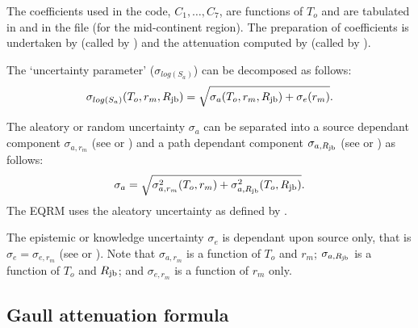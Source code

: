 The coefficients used in the code, $C_1,\ldots,C_7$, are functions
of $T_o$ and are tabulated in \citet[Table 2]{dr_Toro97a} and in
the file 
(for the mid-continent region). The preparation of coefficients is
undertaken by  (called by
) and the attenuation computed by
 (called by
).

The `uncertainty parameter' ($\sigma_{log(S_a)}$) can be
decomposed as follows:
\begin{equation}
 \sigma_{log(S_a)}(T_o,r_m,\Rjb) =
 \sqrt{\sigma_a(T_o,r_m,\Rjb)+\sigma_e(r_m)}.
\end{equation}

The aleatory or random uncertainty $\sigma_a$ can be separated
into a source dependant component $\sigma_{a,r_m}$ (see
\citet[Table 3]{dr_Toro97a} or
) and a path dependant
component $\sigma_{a,\Rjb}$ (see \citet[Table 4]{dr_Toro97a} or
) as follows:
\begin{equation}
\label{eq:attn-toro-aleat} \sigma_a =
\sqrt{\sigma_{a,r_m}^2(T_o,r_m) + \sigma_{a,\Rjb}^2(T_o,\Rjb)}.
\end{equation}
The EQRM uses the aleatory uncertainty as defined by
.

The epistemic or knowledge uncertainty $\sigma_e$ is dependant
upon source only, that is \mbox{$\sigma_e =\sigma_{e,r_m}$} (see
\citet[Page 48]{dr_Toro97a} or
). Note that
$\sigma_{a,r_m}$ is a function of $T_o$ and $r_m$;
$\sigma_{a,\Rjb}$ is a function of $T_o$ and $\Rjb$; and
$\sigma_{e,r_m}$ is a function of $r_m$ only.

\subsection{Gaull attenuation formula}
\label{attn:atten-formula-Gaull}


